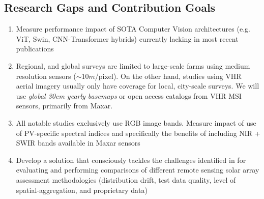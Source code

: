 \subsection{Research Gaps and Contribution Goals}
    \begin{enumerate}
        \item Measure performance impact of SOTA Computer Vision architectures (e.g. ViT, Swin, CNN-Transformer hybrids) currently lacking in most recent publications
        \item Regional, and global surveys are limited to large-scale farms using medium resolution sensors ($\sim10m$/pixel). On the other hand, studies using VHR aerial imagery usually only have coverage for local, city-scale surveys. We will use \textit{global 30cm yearly basemaps} or open access catalogs from VHR MSI sensors, primarily from Maxar. 
        \item All notable studies exclusively use RGB image bands. Measure impact of use of PV-specific spectral indices\cite{He_universal_pv_spectral_index_2024} and specifically the benefits of including NIR + SWIR bands available in Maxar sensors
        \item Develop a solution that consciously tackles the challenges identified in \cite{Hu_solar_array_pitfalls_2022} for evaluating and performing comparisons of different remote sensing solar array assessment methodologies (distribution drift, test data quality, level of spatial-aggregation, and proprietary data)
    \end{enumerate}
    \hfill

